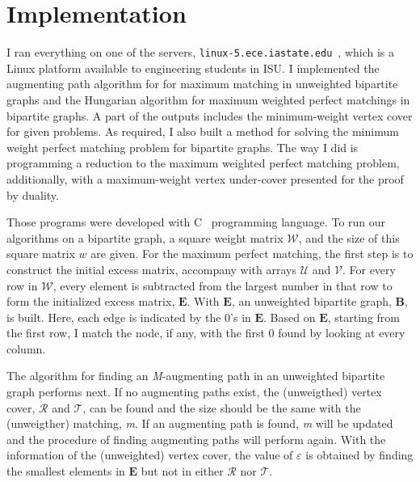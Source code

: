 \documentclass[11pt]{article}
\begin{document}
\section{Implementation}
I ran everything on one of the servers, \texttt{linux-5.ece.iastate.edu}~\cite{Servers}, which is a Linux platform available to engineering students in ISU. I implemented the augmenting path algorithm for for maximum matching in unweighted bipartite graphs and the Hungarian algorithm for maximum weighted perfect matchings in bipartite graphs. A part of the outputs includes the minimum-weight vertex cover for given problems. As required, I also built a method for solving the minimum weight perfect matching problem for bipartite graphs. The way I did is programming a reduction to the maximum weighted perfect matching problem, additionally, with a maximum-weight vertex under-cover presented for the proof by duality.%

Those programs were developed with C~\cite{C} programming language. To run our algorithms on a bipartite graph, a square weight matrix $\mathcal{W}$, and the size of this square matrix $w$ are given. For the maximum perfect matching, the first step is to construct the initial excess matrix, accompany with arrays $\mathcal{U}$ and $\mathcal{V}$. For every row in $\mathcal{W}$, every element is subtracted from the largest number in that row to form the initialized excess matrix, $\mathbf{E}$. With $\mathbf{E}$, an unweighted bipartite graph, $\mathbf{B}$, is built. Here, each edge is indicated by the 0's in $\mathbf{E}$. Based on $\mathbf{E}$, starting from the first row, I match the node, if any, with the first 0 found by looking at every column.

The algorithm for finding an \emph{M}-augmenting path in an unweighted bipartite graph performs next. If no augmenting paths exist, the (unweigthed) vertex cover, $\mathcal{R}$ and $\mathcal{T}$, can be found and the size should be the same with the (unweigther) matching, \emph{m}. If an augmenting path is found, \emph{m} will be updated and the procedure of finding augmenting paths will perform again. With the information of the (unweighted) vertex cover, the value of $\varepsilon$ is obtained by finding the smallest elements in $\mathbf{E}$ but not in either $\mathcal{R}$ nor $\mathcal{T}$.
\end{document}
